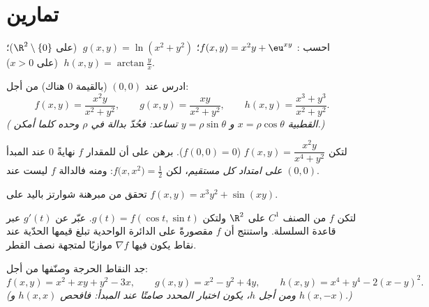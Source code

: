 \section{تمارين}

\begin{exercise}[$\star$]\label{exo:b1:multivar:1}
احسب :
$f(x,y) = x^2 y + \eu^{xy}$؛ $\;g(x,y) = \ln(x^2 + y^2)$ (على
$\R^2\setminus\{0\}$)؛ $\;h(x,y) = \arctan\frac yx$ (على $x > 0$).
\end{exercise}

\begin{exercise}[$\star$]\label{exo:b1:multivar:2}
ادرس  عند $(0,0)$ (بالقيمة $0$ هناك) من أجل:
\[
f(x,y) = \frac{x^2 y}{x^2 + y^2},
\qquad
g(x,y) = \frac{xy}{x^2 + y^2},
\qquad
h(x,y) = \frac{x^3 + y^3}{x^2 + y^2}.
\]
\emph{( القطبية $x = \rho\cos\theta$ و $y = \rho\sin\theta$
تساعد: فحُدّ بدالة في $\rho$ وحده كلما أمكن.)}
\end{exercise}

\begin{exercise}[$\star\star$]\label{exo:b1:multivar:3}
لتكن $f(x,y) = \dfrac{x^2 y}{x^4 + y^2}$ ($f(0,0) = 0$). برهن على أن
للمقدار $f$ نهايةً $0$ عند المبدأ \emph{على امتداد كل مستقيم}،
لكن $f\bigl(x, x^2\bigr) = \frac12$: ومنه فالدالة $f$ ليست  عند
$(0,0)$.
\end{exercise}

\begin{exercise}[$\star$]\label{exo:b1:multivar:4}
تحقق من مبرهنة شوارتز باليد على $f(x, y) = x^3 y^2 + \sin(xy)$.
\end{exercise}

\begin{exercise}[$\star\star$]\label{exo:b1:multivar:5}
لتكن $f$ من الصنف $C^1$ على $\R^2$ ولتكن $g(t) = f(\cos t, \sin t)$. عبّر عن
$g'(t)$ عبر قاعدة السلسلة. واستنتج أن $f$ مقصورةً على الدائرة
الواحدية تبلغ قيمها الحدّية عند نقاط يكون فيها $\nabla f$ موازيًا
لمتجهة نصف القطر.
\end{exercise}

\begin{exercise}[$\star\star$]\label{exo:b1:multivar:6}
جد النقاط الحرجة وصنّفها من أجل:
\[
f(x, y) = x^2 + xy + y^2 - 3x,
\qquad
g(x, y) = x^2 - y^2 + 4y,
\qquad
h(x, y) = x^4 + y^4 - 2(x - y)^2 .
\]
\emph{(ومن أجل $h$، يكون اختبار المحدد صامتًا عند المبدأ:
فافحص $h(x, x)$ و $h(x, -x)$.)}
\end{exercise}

